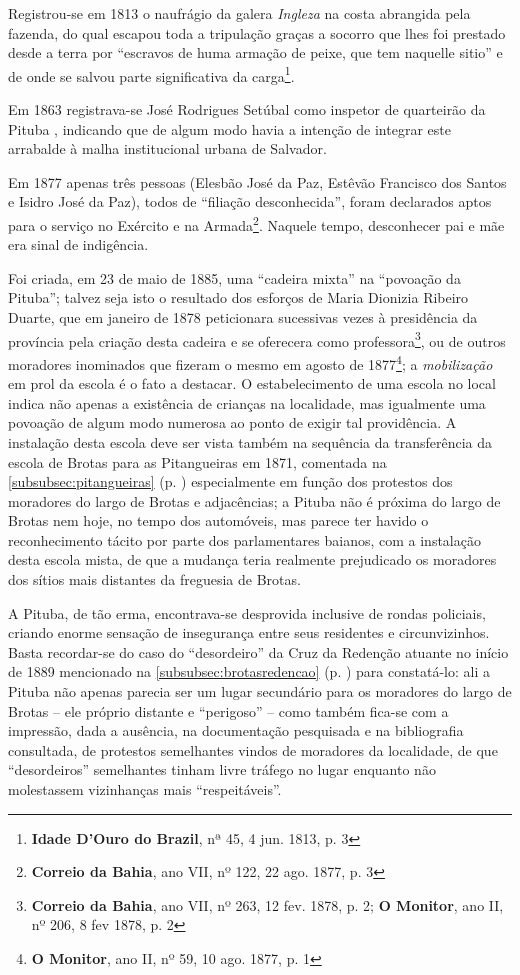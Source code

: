 Registrou-se em 1813 o naufrágio da galera \textit{Ingleza} na costa abrangida pela fazenda, do qual escapou toda a tripulação graças a socorro que lhes foi prestado desde a terra por ``escravos de huma armação de peixe, que tem naquelle sitio'' e de onde se salvou parte significativa da carga\footnote{\textbf{Idade D'Ouro do Brazil}, nª 45, 4 jun. 1813, p. 3}.

Em 1863 registrava-se José Rodrigues Setúbal como inspetor de quarteirão da Pituba \cite[p.~260]{masson_almanak_1863}, indicando que de algum modo havia a intenção de integrar este arrabalde à malha institucional urbana de Salvador.

Em 1877 apenas três pessoas (Elesbão José da Paz, Estêvão Francisco dos Santos e Isidro José da Paz), todos de ``filiação desconhecida'', foram declarados aptos para o serviço no Exército e na Armada\footnote{\textbf{Correio da Bahia}, ano VII, nº 122, 22 ago. 1877, p. 3}. Naquele tempo, desconhecer pai e mãe era sinal de indigência.

Foi criada, em 23 de maio de 1885, uma ``cadeira mixta'' na ``povoação da Pituba''\cite[p.~126]{bahia_relatassleg_1886}; talvez seja isto o resultado dos esforços de Maria Dionizia Ribeiro Duarte, que em janeiro de 1878 peticionara sucessivas vezes à presidência da província pela criação desta cadeira e se oferecera como professora\footnote{\textbf{Correio da Bahia}, ano VII, nº 263, 12 fev. 1878, p. 2; \textbf{O Monitor}, ano II, nº 206, 8 fev 1878, p. 2}, ou de outros moradores inominados que fizeram o mesmo em agosto de 1877\footnote{\textbf{O Monitor}, ano II, nº 59, 10 ago. 1877, p. 1}; a \textit{mobilização} em prol da escola é o fato a destacar. O estabelecimento de uma escola no local indica não apenas a existência de crianças na localidade, mas igualmente uma povoação de algum modo numerosa ao ponto de exigir tal providência. A instalação desta escola deve ser vista também na sequência da transferência da escola de Brotas para as Pitangueiras em 1871, comentada na \autoref{subsubsec:pitangueiras} (p. \pageref{subsubsec:pitangueiras}) especialmente em função dos protestos dos moradores do largo de Brotas e adjacências; a Pituba não é próxima do largo de Brotas nem hoje, no tempo dos automóveis, mas parece ter havido o reconhecimento tácito por parte dos parlamentares baianos, com a instalação desta escola mista, de que a mudança teria realmente prejudicado os moradores dos sítios mais distantes da freguesia de Brotas.

A Pituba, de tão erma, encontrava-se desprovida inclusive de rondas policiais, criando enorme sensação de insegurança entre seus residentes e circunvizinhos. Basta recordar-se do caso do ``desordeiro'' da Cruz da Redenção atuante no início de 1889 mencionado na \autoref{subsubsec:brotasredencao} (p. \pageref{subsubsec:brotasredencao}) para constatá-lo: ali a Pituba não apenas parecia ser um lugar secundário para os moradores do largo de Brotas -- ele próprio distante e ``perigoso'' -- como também fica-se com a impressão, dada a ausência, na documentação pesquisada e na bibliografia consultada, de protestos semelhantes vindos de moradores da localidade, de que ``desordeiros'' semelhantes tinham livre tráfego no lugar enquanto não molestassem vizinhanças mais ``respeitáveis''.

